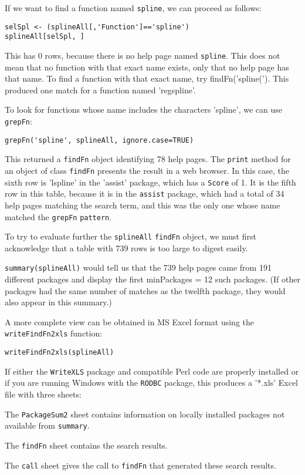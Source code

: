 If we want to find a function named {\tt spline}, we can
proceed as follows:
\begin{verbatim}
selSpl <- (splineAll[,'Function']=='spline')
splineAll[selSpl, ]
\end{verbatim}
This has 0 rows, because there is no help page named
{\tt spline}.  This does not mean that no function
with that exact name exists, only that no help page
has that name.  To find a function with that exact
name, try {findFn('spline(')}.  This produced one match
for a function named 'regspline'.

To look for functions whose name includes the characters 'spline',
we can use {\tt grepFn}:
\begin{verbatim}
grepFn('spline', splineAll, ignore.case=TRUE)
\end{verbatim}
This returned a {\tt findFn} object identifying 78 help pages.
The {\tt print} method for an object of class {\tt findFn}
presents the result in a web browser.  In this case,
the sixth row is 'lspline' in the
'assist' package, which has a {\tt Score} of 1.  It
is the fifth row in this table, because it is in the
{\tt assist} package, which had a total of 34 help
pages matching the search term, and this was the only
one whose name matched the {\tt grepFn} {\tt pattern}.

To try to evaluate further the {\tt splineAll} {\tt findFn}
object, we must first acknowledge that a table with 739 rows
is too large to digest easily.

{\tt summary(splineAll)} would tell us that the 739 help pages
came from 191 different packages and display the first
minPackages = 12 such packages.  (If other packages had the same number of
matches as the twelfth package, they would also appear in this
summary.)

A more complete view can be obtained in MS Excel format
using the {\tt writeFindFn2xls} function:
\begin{verbatim}
writeFindFn2xls(splineAll)
\end{verbatim}
If either the {\tt WriteXLS} package and compatible Perl code
are properly installed or if you are running Windows with
the {\tt RODBC} package, this produces a '*.xls' Excel file
with three sheets:

The {\tt PackageSum2} sheet contains information on locally
installed packages not available from {\tt summary}.

The {\tt findFn} sheet contains the search results.

The {\tt call} sheet gives the call to {\tt findFn}
that generated these search results.

